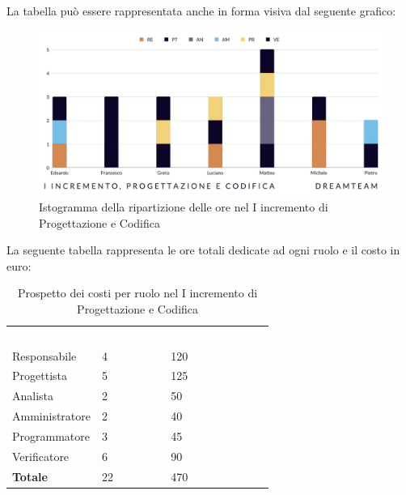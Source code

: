 La tabella può essere rappresentata anche in forma visiva dal seguente grafico:
\begin{figure}[H]
\centering
\includegraphics[scale=0.55]{Sezioni/SezioniPreventivo/grafici/Preventivo_progettazione_I.png}
\caption{Istogramma della ripartizione delle ore nel I incremento di Progettazione e Codifica}
\end{figure}

La seguente tabella rappresenta le ore totali dedicate ad ogni ruolo e il costo in euro:

\begin{table}[H]
\begin{center}
\renewcommand{\arraystretch}{1.5}
\begin{tabular}{ m{}<{\centering}  m{}<{\centering} m{}<{\centering}}
	\rowcolor{darkblue}
	\textcolor{white}{\textbf{Ruolo}}&\textcolor{white}{\textbf{Totale ore}}&\textcolor{white}{\textbf{Costo totale (\euro)}}\\ 

	Responsabile  & 4 & 120 \\	
	
	Progettista & 5 & 125 \\
	
	Analista & 2 & 50 \\

	Amministratore & 2 & 40 \\
	
	Programmatore & 3 & 45 \\
	
	Verificatore & 6 & 90 \\
	
	\textbf{Totale} & 22 & 470 \\
	
\end{tabular}
\caption{Prospetto dei costi per ruolo nel I incremento di Progettazione e Codifica}
\end{center}
\end{table}

